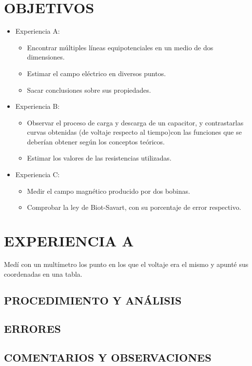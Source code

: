 \documentclass[10pt, twoside]{article}
\begin{document}
\section{OBJETIVOS}
\begin{itemize}
	\item Experiencia A:
		\begin{itemize}
			\item Encontrar múltiples líneas equipotenciales en un medio de dos dimensiones.
			\item Estimar el campo eléctrico en diversos puntos.
			\item Sacar conclusiones sobre sus propiedades.
		\end{itemize}
	\item Experiencia B:
		\begin{itemize}
			\item Observar el proceso de carga y descarga de un capacitor,
				y contrastarlas curvas obtenidas (de voltaje respecto al tiempo)con las funciones
				que se deberían obtener según los conceptos teóricos.
			\item Estimar los valores de las resistencias utilizadas.
		\end{itemize}
	\item Experiencia C:
		\begin{itemize}
			\item Medir el campo magnético producido por dos bobinas.
			\item Comprobar la ley de Biot-Savart, con su porcentaje de error respectivo.
		\end{itemize}
\end{itemize}
\section{EXPERIENCIA A}
Medí con un multímetro los punto en los que el voltaje era el mismo
y apunté sus coordenadas en una tabla.

\subsection{PROCEDIMIENTO Y ANÁLISIS}%
\subsection{ERRORES}%
\subsection{COMENTARIOS Y OBSERVACIONES}%
\end{document}

